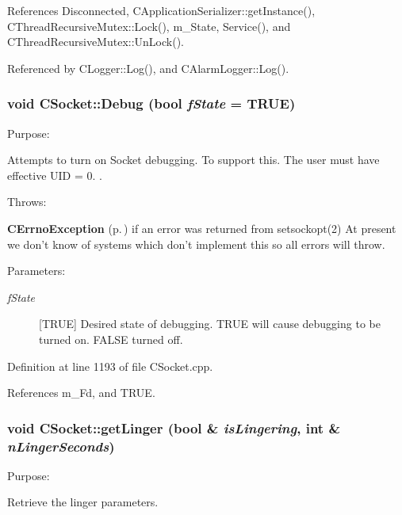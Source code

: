 References Disconnected, CApplication\-Serializer::get\-Instance(), CThread\-Recursive\-Mutex::Lock(), m\_\-State, Service(), and CThread\-Recursive\-Mutex::Un\-Lock().

Referenced by CLogger::Log(), and CAlarm\-Logger::Log().
\subsubsection{\setlength{\rightskip}{0pt plus 5cm}void CSocket::Debug (bool {\em f\-State} = TRUE)}\label{classCSocket_a24}


Purpose:

Attempts to turn on Socket debugging. To support this. The user must have effective UID = 0. .

Throws:\begin{CompactItemize}
\item 
{\bf CErrno\-Exception} {\rm (p.\,\pageref{classCErrnoException})} if an error was returned from setsockopt(2) At present we don't know of systems which don't implement this so all errors will throw.\end{CompactItemize}
\begin{Desc}
\item[Parameters: ]\par
\begin{description}
\item[{\em 
f\-State}][TRUE] Desired state of debugging. TRUE will cause debugging to be turned on. FALSE turned off. \end{description}
\end{Desc}


Definition at line 1193 of file CSocket.cpp.

References m\_\-Fd, and TRUE.
\subsubsection{\setlength{\rightskip}{0pt plus 5cm}void CSocket::get\-Linger (bool \& {\em is\-Lingering}, int \& {\em n\-Linger\-Seconds})}\label{classCSocket_a33}


Purpose:

Retrieve the linger parameters.

